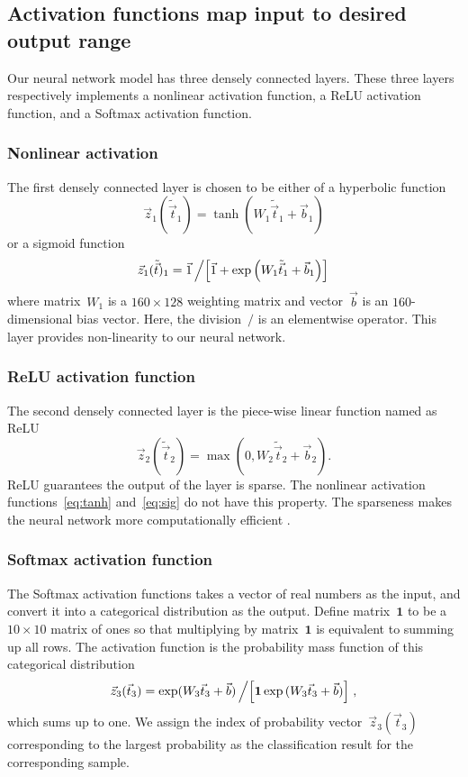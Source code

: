 \subsection{Activation functions map input to desired output range}
Our neural network model has three densely connected layers. These three layers respectively implements a nonlinear activation function, a ReLU activation function, and a Softmax activation function.
\subsubsection{Nonlinear activation\label{sec:nonl}}
The first densely connected layer is chosen to be either of a hyperbolic function 
\begin{equation}
 \vec z_1(\tilde{\vec  t}_1)=\tanh(W_1\tilde{\vec  t}_1+\vec b_1) \label{eq:tanh}
\end{equation}
or a sigmoid function 
\begin{equation}
  \vec z_1 (\tilde{\vec  t})_1 =  {\vec 1}\left/\left[\vec 1 + \exp\left(W_1\tilde{\vec  t}_1+\vec b_1 \right)\right]\right.  \label{eq:sig}
\end{equation}
where matrix~$W_1$ is a $160\times128$ weighting matrix and vector~$\vec b$ is an $160$-dimensional bias vector. 
Here, the division~$/$ is an elementwise operator.
This layer provides non-linearity to our neural network.
\subsubsection{ReLU activation function}
The second densely connected layer is the piece-wise linear function named as ReLU
\begin{equation*}
   \vec z_2(\tilde{\vec  t}_2)=\max(0,W_2\tilde{\vec  t}_2+\vec b_2).
\end{equation*} 
ReLU guarantees the output of the layer is sparse. The nonlinear activation functions~\eqref{eq:tanh} and~\eqref{eq:sig} do not have this property. 
The sparseness makes the neural network more computationally efficient \citep{NIPS20145267}.
\subsubsection{Softmax activation function}
The Softmax activation functions takes a vector of real numbers as the input, and convert it into a categorical distribution as the output. Define matrix~$\mathbf 1$ to be a $10\times 10$ matrix of ones so that multiplying by matrix~$\mathbf 1$ is equivalent to summing up all rows. The activation function is the probability mass function of this categorical distribution
\begin{equation}
     \vec z_{3}(\vec t_3)={\exp(W_3 \vec t_{3}+\vec b)}\left/\left[{\mathbf 1\exp{(W_3 \vec t_{3}+\vec b)}}\right]\right.,
\end{equation}
which sums up to one. We assign the index of probability vector~$\vec z_{3}(\vec t_3)$ corresponding to the largest probability as the classification result for the corresponding sample.

